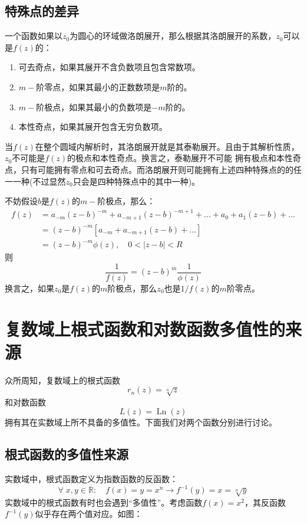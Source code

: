 \documentclass[12pt, a4paper, oneside]{ctexart}
\newcommand{\F}[1][z]
{\ensuremath{f(#1)}}
\begin{document}
\subsection{特殊点的差异}
一个函数如果以$z_0$为圆心的环域做洛朗展开，那么根据其洛朗展开的系数，$z_0$可以是$f(z)$的：
\begin{enumerate}
    \item 可去奇点，如果其展开不含负数项且包含常数项。
    \item $m-$阶零点，如果其最小的正数数项是$m$阶的。
    \item $m-$阶极点，如果其最小的负数项是$-m$阶的。
    \item 本性奇点，如果其展开包含无穷负数项。
\end{enumerate}
当$f(z)$在整个圆域内解析时，其洛朗展开就是其泰勒展开。且由于其解析性质，$z_0$不可能是$f(z)$的极点和本性奇点。换言之，泰勒展开不可能
拥有极点和本性奇点，只有可能拥有零点和可去奇点。而洛朗展开则可能拥有上述四种特殊点的的任一一种(不过显然$z_0$只会是四种特殊点中的其中一种)。

不妨假设$b$是$\F$的$m-$阶极点，那么：
$$
\begin{aligned}
f(z) &=a_{-m}(z-b)^{-m}+a_{-m+1}(z-b)^{-m+1}+\ldots+a_{0}+a_{1}(z-b)+\ldots \\
&=(z-b)^{-m}\left[a_{-m}+a_{-m+1}(z-b)+\ldots\right] \\
&=(z-b)^{-m} \phi(z), \quad 0<|z-b|<R
\end{aligned}
$$
则
$$
\frac{1}{f(z)}=(z-b)^{m} \frac{1}{\phi(z)}
$$
换言之，如果$z_0$是$\F$的$m$阶极点，那么$z_0$也是$1/\F$的$m$阶零点。

\section{复数域上根式函数和对数函数多值性的来源}
众所周知，复数域上的根式函数
$$
r_n(z)=\sqrt[n]{z}
$$
和对数函数
$$
L(z)=\operatorname{Ln}(z)
$$
拥有其在实数域上所不具备的多值性。下面我们对两个函数分别进行讨论。
\subsection{根式函数的多值性来源}
实数域中，根式函数定义为指数函数的反函数：
$$\forall\; x,y\in \mathbb{R}:\quad f(x)=y=x^n \to f^{-1}(y)=x=\sqrt[n]{y}$$
实数域中的根式函数有时也会遇到“多值性”。考虑函数$f(x)=x^2$，其反函数$f^{-1}(y)$似乎存在两个值对应。如图：
\end{document}

